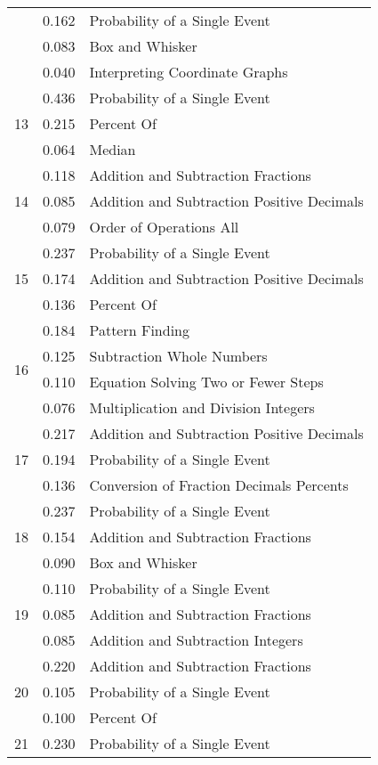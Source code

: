 \begin{longtable}[c]{|c|c|l|}
 & 0.162 & Probability of a Single Event \\
 & 0.083 & Box and Whisker \\
 & 0.040 & Interpreting Coordinate Graphs  \\
\hline
\multirow{3}{*}{13} & 0.436 & Probability of a Single Event \\
 & 0.215 & Percent Of \\
 & 0.064 & Median \\
\hline
\multirow{3}{*}{14} & 0.118 & Addition and Subtraction Fractions \\
 & 0.085 & Addition and Subtraction Positive Decimals \\
 & 0.079 & Order of Operations All \\
\hline
\multirow{3}{*}{15} & 0.237 & Probability of a Single Event \\
 & 0.174 & Addition and Subtraction Positive Decimals \\
 & 0.136 & Percent Of \\
\hline
\multirow{4}{*}{16} & 0.184 & Pattern Finding  \\
 & 0.125 & Subtraction Whole Numbers \\
 & 0.110 & Equation Solving Two or Fewer Steps \\
 & 0.076 & Multiplication and Division Integers \\
\hline
\multirow{3}{*}{17} & 0.217 & Addition and Subtraction Positive Decimals \\
 & 0.194 & Probability of a Single Event \\
 & 0.136 & Conversion of Fraction Decimals Percents \\
\hline
\multirow{3}{*}{18} & 0.237 & Probability of a Single Event \\
 & 0.154 & Addition and Subtraction Fractions \\
 & 0.090 & Box and Whisker \\
\hline
\multirow{3}{*}{19} & 0.110 & Probability of a Single Event \\
 & 0.085 & Addition and Subtraction Fractions \\
 & 0.085 & Addition and Subtraction Integers \\
\hline
\multirow{3}{*}{20} & 0.220 & Addition and Subtraction Fractions \\
 & 0.105 & Probability of a Single Event \\
 & 0.100 & Percent Of \\
\hline
\multirow{5}{*}{21} & 0.230 & Probability of a Single Event \\

\end{longtable}
